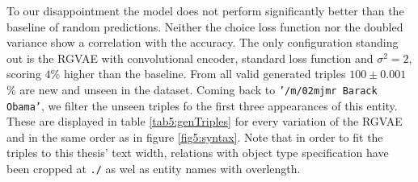 To our disappointment the model does not perform significantly better than the baseline of random predictions. Neither the choice loss function nor the doubled variance show a correlation with the accuracy. The only configuration standing out is the RGVAE with convolutional encoder, standard loss function and $\sigma^2=2$, scoring $4$\% higher than the baseline. From all valid generated triples $100\pm 0.001$\% are new and unseen in the dataset. Coming back to \texttt{'/m/02mjmr Barack Obama'}, we filter the unseen triples fo the first three appearances of this entity. These are displayed in table \ref{tab5:genTriples} for every variation of the RGVAE and in the same order as in figure \ref{fig5:syntax}. Note that in order to fit the triples to this thesis' text width, relations with object type specification have been cropped at \texttt{./} as wel as entity names with overlength. 



